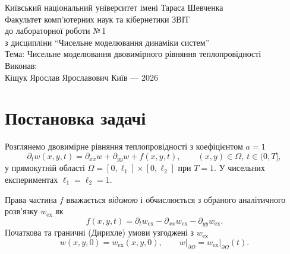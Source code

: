 \documentclass[12pt,a4paper]{article}
\newcommand{\Om}{\Omega}
\newcommand{\wex}{w_{\mathrm{ex}}}
\newcommand{\dt}{\partial_t}
\newcommand{\dxx}{\partial_{xx}}
\newcommand{\dyy}{\partial_{yy}}
\begin{document}
\begin{titlepage}
  \centering\thispagestyle{empty}
  Київський національний університет імені Тараса Шевченка\\
  Факультет комп'ютерних наук та кібернетики
  \vfill
  {\Large ЗВІТ}\\[0.35em]
  до лабораторної роботи №\,1\\
  з дисципліни ``Чисельне моделювання динаміки систем''\\[1.1em]
  {\large Тема: Чисельне моделювання двовимірного рівняння теплопровідності\\}
  \vfill
  \raggedleft
  Виконав:\\
  Кіщук Ярослав Ярославович
  \vfill
  \centering Київ --- 2026
\end{titlepage}

\begin{abstract}
\noindent У роботі чисельно розв'язано двовимірне нестаціонарне рівняння теплопровідності на прямокутній області. Побудовано три різницеві схеми за джерелами [1]--[2]: явну п'ятиточкову (схема (6), с.\,236 [1]), метод змінних напрямків () с.\,237 [1]) та ДС-алгоритм --- двокрокову симетризовану схему на шахівничній підмножині вузлів (адаптація ідей [2] до параболічної 2D задачі). Для верифікації використано точний розв'язок варіанта\,5 (гауссівське ядро). Наведено heatmap, 3D-поверхні, анімацію, поля абсолютної похибки, залежність норм $\|e\|_\infty$, $\|e\|_2$ від часу.
\end{abstract}

\tableofcontents
\newpage

\section{Постановка задачі}

Розглянемо двовимірне рівняння теплопровідності з коефіцієнтом $a=1$
\begin{equation}
  \dt w(x,y,t) = \dxx w + \dyy w + f(x,y,t),
  \qquad (x,y)\in\Om,\ t\in(0,T], \label{eq:pde}
\end{equation}
у прямокутній області $\Om = [0,\ell_1]\times[0,\ell_2]$ при $T=1$. У чисельних експериментах $\ell_1=\ell_2=1$.

Права частина $f$ вважається \emph{відомою} і обчислюється з обраного аналітичного розв'язку $\wex$ як
\begin{equation}
  f(x,y,t) = \dt \wex - \dxx \wex - \dyy \wex. \label{eq:fdef}
\end{equation}
Початкова та граничні (Дирихле) умови узгоджені з $\wex$
\begin{equation}
  w(x,y,0) = \wex(x,y,0),\qquad
  w\big|_{\partial\Om} = \wex\big|_{\partial\Om}(t). \label{eq:icbc}
\end{equation}
\end{document}
